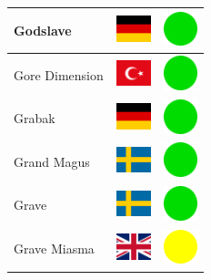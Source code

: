 \documentclass[12pt, a4paper, twoside]{report}
\begin{document}
\begin{center}
\begin{longtable}{|p{5cm}|p{2cm}|p{2cm}|}
Godslave & \includegraphics[width=1cm]{4x3/de} & \includegraphics[width=1cm]{likes/y} \\ \hline
Gore Dimension & \includegraphics[width=1cm]{4x3/tr} & \includegraphics[width=1cm]{likes/y} \\ \hline
Grabak & \includegraphics[width=1cm]{4x3/de} & \includegraphics[width=1cm]{likes/y} \\ \hline
Grand Magus & \includegraphics[width=1cm]{4x3/se} & \includegraphics[width=1cm]{likes/y} \\ \hline
Grave & \includegraphics[width=1cm]{4x3/se} & \includegraphics[width=1cm]{likes/y} \\ \hline
Grave Miasma & \includegraphics[width=1cm]{4x3/gb} & \includegraphics[width=1cm]{likes/m} \\ \hline

\end{longtable}
\end{center}
\end{document}
